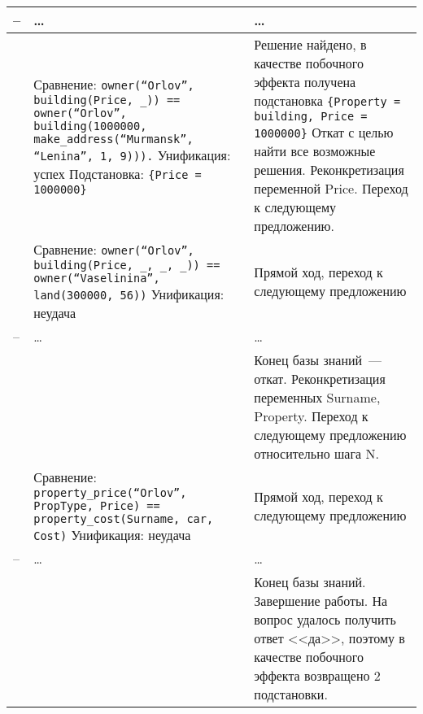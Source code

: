\begin{xltabular}{\textwidth}{|l|X|Y|}
		--  & \dots & \dots \\ \hline
		
		&
		Сравнение:
		\texttt{owner(``Orlov'', building(Price, \_)) == owner(``Orlov'', building(1000000, make\_address(``Murmansk'', ``Lenina'', 1, 9))).} \newline\newline
		Унификация: успех \newline\newline
		Подстановка: \texttt{\{Price = 1000000\}} & 
		Решение найдено, в качестве побочного эффекта получена подстановка \texttt{\{Property = building, Price = 1000000\}} \newline\newline 
		Откат с целью найти все возможные решения.
		Реконкретизация переменной Price.
		Переход к следующему предложению.\\ \hline
		
		&
		Сравнение:
		\texttt{owner(``Orlov'', building(Price, \_, \_, \_)) == 	owner(``Vaselinina'', land(300000, 56))} \newline\newline
		Унификация: неудача &
		Прямой ход, переход к следующему предложению \\ \hline
		
		--  & \dots & \dots \\ \hline
		
		 &
		 &
		Конец базы знаний~--- откат.
		Реконкретизация переменных Surname, Property.
		Переход к следующему предложению относительно шага N.\\ \hline
		
		&
		Сравнение:
		\texttt{property\_price(``Orlov'', PropType, Price) == property\_cost(Surname, car, Cost)} \newline\newline
		Унификация: неудача &
		Прямой ход, переход к следующему предложению \\ \hline
				
		--  & \dots & \dots \\ \hline
		
		&
		&
		Конец базы знаний.
		Завершение работы. \newline\newline
		На вопрос удалось получить ответ <<да>>, поэтому в качестве побочного эффекта возвращено 2 подстановки.
		\\ \hline
	\end{xltabular}